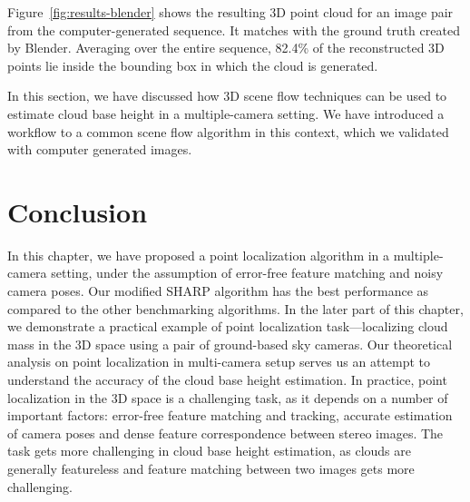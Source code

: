 Figure~\ref{fig:results-blender} shows the resulting 3D point cloud for an image pair from the computer-generated sequence. It matches with the ground truth created by Blender. Averaging over the entire sequence, 82.4\% of the reconstructed 3D points lie inside the bounding box in which the cloud is generated.


In this section, we have discussed how 3D scene flow techniques can be used to estimate cloud base height in a multiple-camera setting. We have introduced a workflow to a common scene flow algorithm in this context, which we validated with computer generated images. 


\section{Conclusion}
\label{sec:chap8-conclude}
In this chapter, we have proposed a point localization algorithm in a multiple-camera setting, under the assumption of error-free feature matching and noisy camera poses. Our modified SHARP algorithm has the best performance as compared to the other benchmarking algorithms. In the later part of this chapter, we demonstrate a practical example of point localization task---localizing cloud mass in the 3D space using a pair of ground-based sky cameras. Our theoretical analysis on point localization in multi-camera setup serves us an attempt to understand the accuracy of the cloud base height estimation. In practice, point localization in the 3D space is a challenging task, as it depends on a number of important factors: error-free feature matching and tracking, accurate estimation of camera poses and dense feature correspondence between stereo images. The task gets more challenging in cloud base height estimation, as clouds are generally featureless and feature matching between two images gets more challenging. 




































